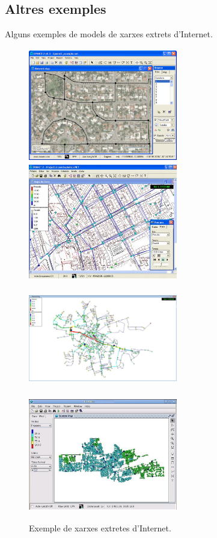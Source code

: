 \documentclass[12pt]{article}
\begin{document}
\subsection{Altres exemples}
Alguns exemples de models de xarxes extrets d'Internet.
\begin{figure}[h!]
	\centering
	\includegraphics[width=65mm, height=50mm]{imatges/epanet/exemples/x1.png}
	\hspace{.2cm}
	\includegraphics[width=65mm, height=50mm]{imatges/epanet/exemples/x2.jpg}
	\includegraphics[width=65mm, height=50mm]{imatges/epanet/exemples/x3.jpg}
	\hspace{.2cm}
	\includegraphics[width=65mm, height=50mm]{imatges/epanet/exemples/x4.jpg}
	\caption{Exemple de xarxes extretes d'Internet.}
\end{figure}
\end{document}

